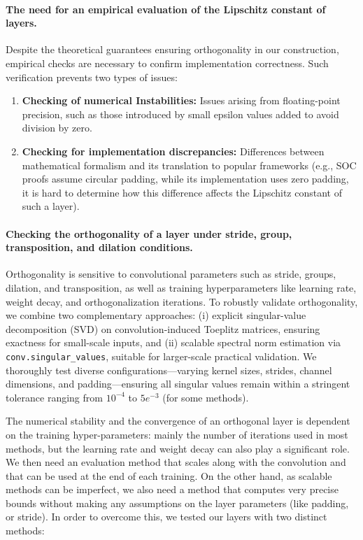     \paragraph{The need for an empirical evaluation of the Lipschitz constant of layers.}
    Despite the theoretical guarantees ensuring orthogonality in our construction, empirical checks are necessary to confirm implementation correctness. Such verification prevents two types of issues:
    \begin{enumerate}
        \item \textbf{Checking of numerical Instabilities:} Issues arising from floating-point precision, such as those introduced by small epsilon values added to avoid division by zero.
        \item \textbf{Checking for implementation discrepancies:} Differences between mathematical formalism and its translation to popular frameworks (e.g., SOC proofs assume circular padding, while its implementation uses zero padding, it is hard to determine how this difference affects the Lipschitz constant of such a layer).
    \end{enumerate}

    \paragraph{Checking the orthogonality of a layer under stride, group, transposition, and dilation conditions.}
    Orthogonality is sensitive to convolutional parameters such as stride, groups, dilation, and transposition, as well as training hyperparameters like learning rate, weight decay, and orthogonalization iterations. To robustly validate orthogonality, we combine two complementary approaches: (i) explicit singular-value decomposition (SVD) on convolution-induced Toeplitz matrices, ensuring exactness for small-scale inputs, and (ii) scalable spectral norm estimation via \texttt{conv.singular\_values}, suitable for larger-scale practical validation. We thoroughly test diverse configurations—varying kernel sizes, strides, channel dimensions, and padding—ensuring all singular values remain within a stringent tolerance ranging from $10^{-4}$ to $5e^{-3}$ (for some methods).

    The numerical stability and the convergence of an orthogonal layer is dependent on the training hyper-parameters: mainly the number of iterations used in most methods, but the learning rate and weight decay can also play a significant role. We then need an evaluation method that scales along with the convolution and that can be used at the end of each training. On the other hand, as scalable methods can be imperfect, we also need a method that computes very precise bounds without making any assumptions on the layer parameters (like padding, or stride). In order to overcome this, we tested our layers with two distinct methods:
    
